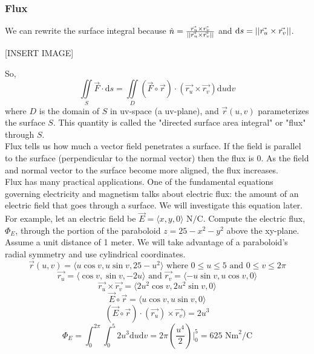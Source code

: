 \subsubsection{Flux}
\noindent
We can rewrite the surface integral because $\hat{n} = \frac{\vec{r_u} \times \vec{r_v}}{\left|\left|\vec{r_u} \times \vec{r_v}\right|\right|}$ and $\mathrm{d}s = \left|\left|\vec{r_u} \times \vec{r_v}\right|\right|$.

[INSERT IMAGE]

\noindent
So,
\begin{equation*}
	\iint\limits_{S}{\vec{F} \cdot \mathrm{d}s} = \iint\limits_{D}{\left(\vec{F}\circ\vec{r}\right) \cdot \left(\vec{r_u} \times \vec{r_v}\right)\mathrm{d}u\mathrm{d}v}
\end{equation*}
where $D$ is the domain of $S$ in uv-space (a uv-plane), and $\vec{r}(u,v)$ parameterizes the surface $S$. This quantity is called the "directed surface area integral" or "flux" through $S$.\\

\noindent
Flux tells us how much a vector field penetrates a surface. If the field is parallel to the surface (perpendicular to the normal vector) then the flux is 0. As the field and normal vector to the surface become more aligned, the flux increases. \\

\noindent
Flux has many practical applications. One of the fundamental equations governing electricity and magnetism talks about electric flux: the amount of an electric field that goes through a surface. We will investigate this equation later.\\

\noindent
For example, let an electric field be $\vec{E} = \langle x, y, 0 \rangle \text{ N}/ \text{C}$. Compute the electric flux, $\Phi_{E}$, through the portion of the paraboloid $z=25-x^2-y^2$ above the xy-plane. Assume a unit distance of 1 meter.
\indent
We will take advantage of a paraboloid's radial symmetry and use cylindrical coordinates.
\begin{equation*}
	\vec{r}(u,v) = \langle u\cos{v}, u\sin{v}, 25 - u^2 \rangle \text{ where } 0 \leq u \leq 5 \text{ and } 0 \leq v \leq 2\pi\end{equation*}
\begin{equation*}
	\vec{r_u} = \langle \cos{v}, \sin{v}, -2u \rangle \text{ and } \vec{r_v}=\langle -u\sin{v}, u\cos{v}, 0 \rangle 
\end{equation*}
\begin{equation*}
	\vec{r_u} \times \vec{r_v} = \langle 2u^2\cos{v}, 2u^2\sin{v}, 0 \rangle
\end{equation*}
\begin{equation*}
	\vec{E}\circ\vec{r} = \langle u\cos{v}, u\sin{v}, 0 \rangle
\end{equation*}
\begin{equation*}
	\left(\vec{E}\circ\vec{r}\right) \cdot (\vec{r_u}) \times \vec{r_v}) = 2u^3
\end{equation*}
\begin{equation*}
	\Phi_{E} = \int_{0}^{2\pi}{\int_{0}^{5}{2u^3\mathrm{d}u}\mathrm{d}v} = 2\pi\left(\frac{u^4}{2}\right)\rvert_{0}^{5} = 625\text{ Nm}^2/\text{C}
\end{equation*}